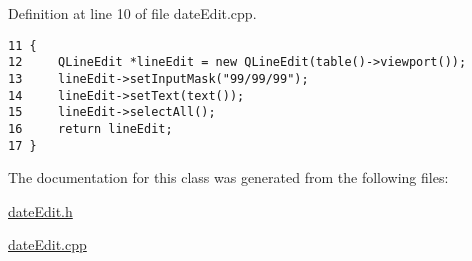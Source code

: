Definition at line 10 of file date\-Edit.cpp.

\footnotesize\begin{verbatim}11 {
12     QLineEdit *lineEdit = new QLineEdit(table()->viewport());
13     lineEdit->setInputMask("99/99/99");
14     lineEdit->setText(text());
15     lineEdit->selectAll();
16     return lineEdit;
17 }
\end{verbatim}\normalsize 




The documentation for this class was generated from the following files:\begin{CompactItemize}
\item 
\hyperlink{dateEdit_8h}{date\-Edit.h}\item 
\hyperlink{dateEdit_8cpp}{date\-Edit.cpp}\end{CompactItemize}
